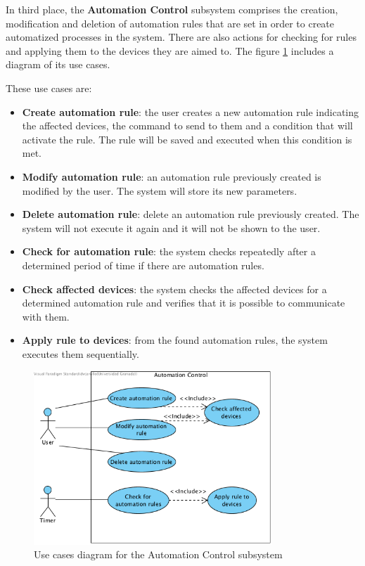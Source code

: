 In third place, the \textbf{Automation Control} subsystem comprises the creation, modification and deletion of automation rules that
are set in order to create automatized processes in the system. There are also actions for checking for rules and applying them to 
the devices they are aimed to. The figure \ref{fig:UC-automation-control} includes a diagram of its use cases.

These use cases are:
\begin{itemize}
	\item \textbf{Create automation rule}: the user creates a new automation rule indicating the affected devices, the command to 
	send to them and a condition that will activate the rule. The rule will be saved and executed when this condition is met.
	\item \textbf{Modify automation rule}: an automation rule previously created is modified by the user. The system will store its
	new parameters.
	\item \textbf{Delete automation rule}: delete an automation rule previously created. The system will not execute it again and
	it will not be shown to the user.
	\item \textbf{Check for automation rule}: the system checks repeatedly after a determined period of time if there are automation 
	rules.
	\item \textbf{Check affected devices}: the system checks the affected devices for a determined automation rule and verifies
	that it is possible to communicate with them.
	\item \textbf{Apply rule to devices}: from the found automation rules, the system executes them sequentially.
\end{itemize}

\begin{figure}
	\centering
	\includegraphics[width=0.8\textwidth]{images/Chapter_07/UC-automation-control.png}
	\caption{Use cases diagram for the Automation Control subsystem}
	\label{fig:UC-automation-control}
\end{figure}


